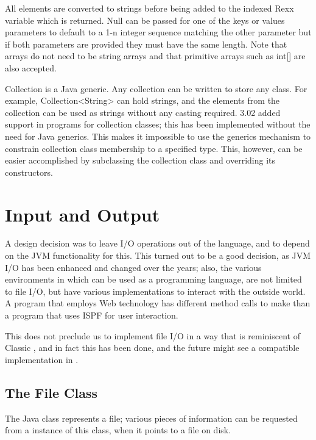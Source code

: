 {All elements are converted to strings before being added to the indexed Rexx variable which is returned. Null can be passed for one of the keys or values parameters to default to a 1-n integer sequence matching the other parameter but if both parameters are provided they must have the same length. Note that arrays do not need to be string arrays and that primitive arrays such as int[] are also accepted.
\begin{shaded}
Collection is a Java generic. Any collection can be written to store any
class. For example, Collection<String> can hold strings, and the
elements from the collection can be used as strings without any
casting required. \nr{} 3.02 added  support in
\nr{} programs for collection classes; this has been implemented
without the need for Java generics. This makes it impossible to use
the generics mechanism to constrain collection class membership to a
specified type. This, however, can be easier accomplished by
subclassing the collection class and overriding its constructors.
\end{shaded}


 
\chapter{Input and Output}
A \nr{} design decision was to leave I/O operations out of the
language, and to depend on the JVM functionality for this. This
turned out to be a good decision, as JVM I/O has been enhanced and
changed over the years; also, the various environments in which \nr{}
can be used as a programming language, are not limited to file I/O,
but have various implementations to interact with the outside world. A
\nr{} program that employs Web technology has different method calls
to make than a program that uses ISPF for user interaction.

This does not preclude us to implement file I/O in a way that is
reminiscent of Classic \Rexx{}, and in fact this has been done, and
the future might see a compatible implementation in \nr{}.


  \section{The File Class}
  The Java  class represents a file; various pieces of
  information can be requested from a instance of this class, when it
  points to a file on disk.

}
